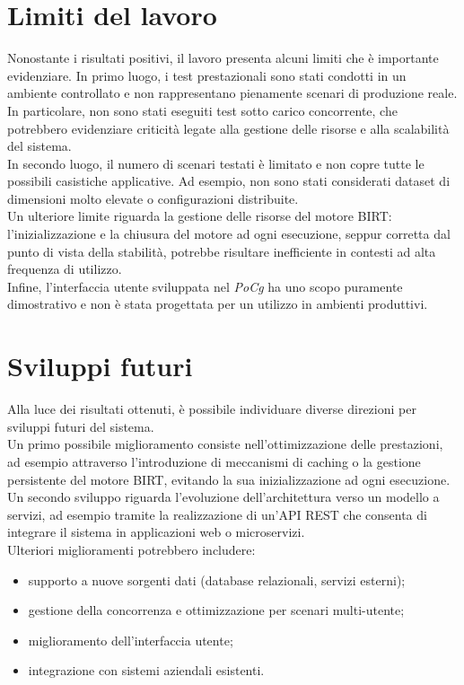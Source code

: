 \section{Limiti del lavoro}
Nonostante i risultati positivi, il lavoro presenta alcuni limiti che è importante evidenziare.
In primo luogo, i test prestazionali sono stati condotti in un ambiente controllato e non rappresentano pienamente scenari di produzione reale. In particolare, non sono stati eseguiti test sotto carico concorrente, che potrebbero evidenziare criticità legate alla gestione delle risorse e alla scalabilità del sistema.\\
In secondo luogo, il numero di scenari testati è limitato e non copre tutte le possibili casistiche applicative. Ad esempio, non sono stati considerati dataset di dimensioni molto elevate o configurazioni distribuite.\\
Un ulteriore limite riguarda la gestione delle risorse del motore BIRT: l'inizializzazione e la chiusura del motore ad ogni esecuzione, seppur corretta dal punto di vista della stabilità, potrebbe risultare inefficiente in contesti ad alta frequenza di utilizzo.\\
Infine, l'interfaccia utente sviluppata nel \emph{\gls{PoCg}} ha uno scopo puramente dimostrativo e non è stata progettata per un utilizzo in ambienti produttivi.

\section{Sviluppi futuri}
Alla luce dei risultati ottenuti, è possibile individuare diverse direzioni per sviluppi futuri del sistema.\\
Un primo possibile miglioramento consiste nell'ottimizzazione delle prestazioni, ad esempio attraverso l'introduzione di meccanismi di caching o la gestione persistente del motore BIRT, evitando la sua inizializzazione ad ogni esecuzione.\\
Un secondo sviluppo riguarda l'evoluzione dell'architettura verso un modello a servizi, ad esempio tramite la realizzazione di un'API REST che consenta di integrare il sistema in applicazioni web o microservizi.\\

Ulteriori miglioramenti potrebbero includere:
\begin{itemize}
    \item supporto a nuove sorgenti dati (database relazionali, servizi esterni);
    \item gestione della concorrenza e ottimizzazione per scenari multi-utente;
    \item miglioramento dell'interfaccia utente;
    \item integrazione con sistemi aziendali esistenti.
\end{itemize}

